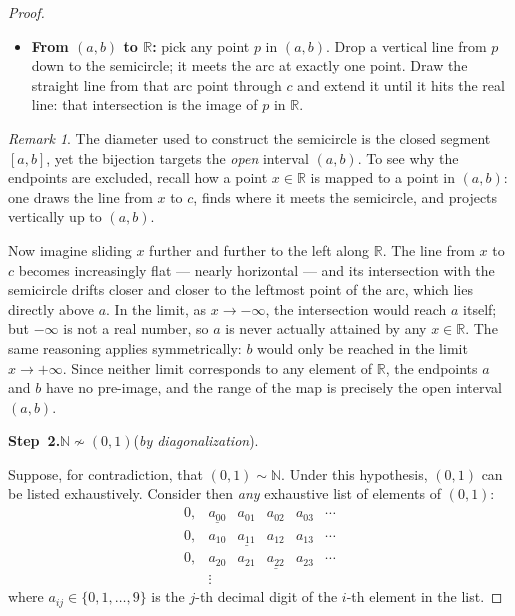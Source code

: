 \documentclass[12pt]{article}
\theoremstyle{definition}
\theoremstyle{plain}
\theoremstyle{remark}
\newtheorem{remark}{Remark}[section]
\newcommand{\N}{\mathbb{N}}
\newcommand{\R}{\mathbb{R}}
\begin{document}
\begin{proof}
\begin{itemize}[nosep]
    \item \textbf{From $(a,b)$ to $\R$:} pick any point $p$ in $(a,b)$.
          Drop a vertical line from $p$ down to the semicircle; it meets the
          arc at exactly one point. Draw the straight line from that arc point
          through $c$ and extend it until it hits the real line: that
          intersection is the image of $p$ in $\R$.
\end{itemize}

\medskip
\begin{remark}
The diameter used to construct the semicircle is the closed segment $[a,b]$, yet
the bijection targets the \emph{open} interval $(a,b)$. To see why the endpoints
are excluded, recall how a point $x\in\R$ is mapped to a point in $(a,b)$: one
draws the line from $x$ to $c$, finds where it meets the semicircle, and projects
vertically up to $(a,b)$.

Now imagine sliding $x$ further and further to the left along $\R$. The line from
$x$ to $c$ becomes increasingly flat --- nearly horizontal --- and its
intersection with the semicircle drifts closer and closer to the leftmost point of
the arc, which lies directly above $a$. In the limit, as $x\to-\infty$, the
intersection would reach $a$ itself; but $-\infty$ is not a real number, so $a$ is
never actually attained by any $x\in\R$. The same reasoning applies symmetrically:
$b$ would only be reached in the limit $x\to+\infty$. Since neither limit
corresponds to any element of $\R$, the endpoints $a$ and $b$ have no pre-image,
and the range of the map is precisely the open interval $(a,b)$.
\end{remark}

\medskip
\noindent\textbf{Step~2.}\quad $\N \not\sim (0,1)$\quad(\emph{by diagonalization}).

\smallskip
Suppose, for contradiction, that $(0,1)\sim\N$. Under this hypothesis,
$(0,1)$ can be listed exhaustively.  Consider then \emph{any} exhaustive list of
elements of $(0,1)$:
\[
\begin{array}{lllllll}
  0, & \underline{a_{00}} & a_{01} & a_{02} & a_{03} & \cdots \\[2pt]
  0, & a_{10} & \underline{a_{11}} & a_{12} & a_{13} & \cdots \\[2pt]
  0, & a_{20} & a_{21} & \underline{a_{22}} & a_{23} & \cdots \\[2pt]
     & \vdots
\end{array}
\]
where $a_{ij}\in\{0,1,\ldots,9\}$ is the $j$-th decimal digit of the $i$-th
element in the list.


\end{proof}
\end{document}
